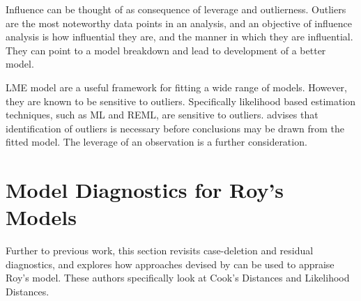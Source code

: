 \documentclass[]{report}
\begin{document}
	
	
Influence can be thought of as consequence of leverage and outlierness. Outliers are the most noteworthy data points in an analysis, and an objective of influence analysis is how influential they are, and the manner in which they are influential. They can point to a model breakdown and lead to development of a better model.

LME model are a useful framework for fitting a wide range of models. However, they are known to be sensitive to outliers. Specifically likelihood based estimation techniques, such as ML and REML, are sensitive to outliers. \citet{Christensen} advises that identification of outliers is necessary before conclusions may be drawn from the fitted model. The leverage of an observation is a further consideration. 
	

	



	\section{Model Diagnostics for Roy's Models}
	
	Further to previous work, this section revisits case-deletion and residual diagnostics, and explores how approaches devised by  \citet{Galecki} can be used to appraise Roy's model. These authors specifically look at Cook's Distances and Likelihood Distances.
	
\end{document}
